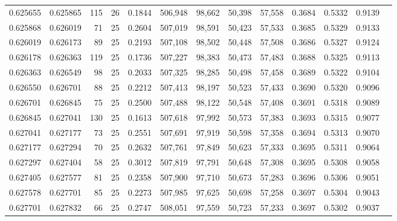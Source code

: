 \begin{tabular}{rrrrrrrrrrrrr}
0.625655 & 0.625865 &   115 &  26 &                                     0.1844 & 506,948 &  98,662 &  50,398 &  57,558 & 0.3684 & 0.5332 & 0.9139 \\
0.625868 & 0.626019 &    71 &  25 &                                     0.2604 & 507,019 &  98,591 &  50,423 &  57,533 & 0.3685 & 0.5329 & 0.9133 \\
0.626019 & 0.626173 &    89 &  25 &                                     0.2193 & 507,108 &  98,502 &  50,448 &  57,508 & 0.3686 & 0.5327 & 0.9124 \\
0.626178 & 0.626363 &   119 &  25 &                                     0.1736 & 507,227 &  98,383 &  50,473 &  57,483 & 0.3688 & 0.5325 & 0.9113 \\
0.626363 & 0.626549 &    98 &  25 &                                     0.2033 & 507,325 &  98,285 &  50,498 &  57,458 & 0.3689 & 0.5322 & 0.9104 \\
0.626550 & 0.626701 &    88 &  25 &                                     0.2212 & 507,413 &  98,197 &  50,523 &  57,433 & 0.3690 & 0.5320 & 0.9096 \\
0.626701 & 0.626845 &    75 &  25 &                                     0.2500 & 507,488 &  98,122 &  50,548 &  57,408 & 0.3691 & 0.5318 & 0.9089 \\
0.626845 & 0.627041 &   130 &  25 &                                     0.1613 & 507,618 &  97,992 &  50,573 &  57,383 & 0.3693 & 0.5315 & 0.9077 \\
0.627041 & 0.627177 &    73 &  25 &                                     0.2551 & 507,691 &  97,919 &  50,598 &  57,358 & 0.3694 & 0.5313 & 0.9070 \\
0.627177 & 0.627294 &    70 &  25 &                                     0.2632 & 507,761 &  97,849 &  50,623 &  57,333 & 0.3695 & 0.5311 & 0.9064 \\
0.627297 & 0.627404 &    58 &  25 &                                     0.3012 & 507,819 &  97,791 &  50,648 &  57,308 & 0.3695 & 0.5308 & 0.9058 \\
0.627405 & 0.627577 &    81 &  25 &                                     0.2358 & 507,900 &  97,710 &  50,673 &  57,283 & 0.3696 & 0.5306 & 0.9051 \\
0.627578 & 0.627701 &    85 &  25 &                                     0.2273 & 507,985 &  97,625 &  50,698 &  57,258 & 0.3697 & 0.5304 & 0.9043 \\
0.627701 & 0.627832 &    66 &  25 &                                     0.2747 & 508,051 &  97,559 &  50,723 &  57,233 & 0.3697 & 0.5302 & 0.9037 \\

\end{tabular}
